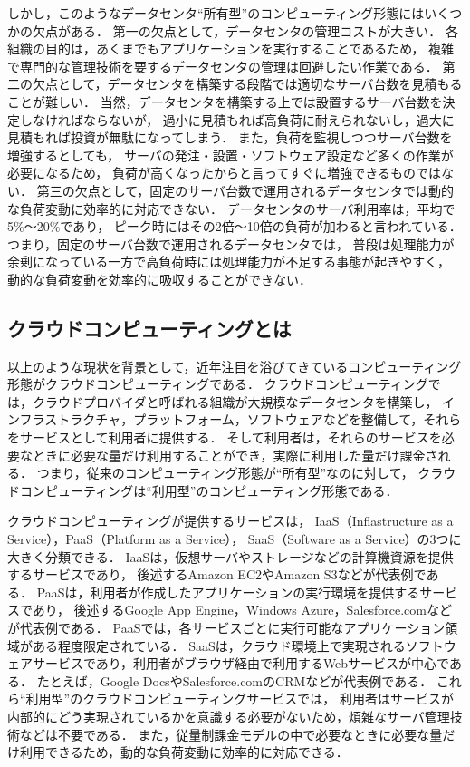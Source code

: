 \documentclass[10pt]{jsarticle}
\begin{document}
しかし，このようなデータセンタ``所有型''のコンピューティング形態にはいくつかの欠点がある．
第一の欠点として，データセンタの管理コストが大きい．
各組織の目的は，あくまでもアプリケーションを実行することであるため，
複雑で専門的な管理技術を要するデータセンタの管理は回避したい作業である．
第二の欠点として，データセンタを構築する段階では適切なサーバ台数を見積もることが難しい．
当然，データセンタを構築する上では設置するサーバ台数を決定しなければならないが，
過小に見積もれば高負荷に耐えられないし，過大に見積もれば投資が無駄になってしまう．
また，負荷を監視しつつサーバ台数を増強するとしても，
サーバの発注・設置・ソフトウェア設定など多くの作業が必要になるため，
負荷が高くなったからと言ってすぐに増強できるものではない．
第三の欠点として，固定のサーバ台数で運用されるデータセンタでは動的な負荷変動に効率的に対応できない．
データセンタのサーバ利用率は，平均で5\%〜20\%であり，
ピーク時にはその2倍〜10倍の負荷が加わると言われている\cite{t10}．
つまり，固定のサーバ台数で運用されるデータセンタでは，
普段は処理能力が余剰になっている一方で高負荷時には処理能力が不足する事態が起きやすく，
動的な負荷変動を効率的に吸収することができない．

\subsection{クラウドコンピューティングとは}

以上のような現状を背景として，近年注目を浴びてきているコンピューティング形態がクラウドコンピューティング\cite{t10,t11,t12}である．
クラウドコンピューティングでは，クラウドプロバイダと呼ばれる組織が大規模なデータセンタを構築し，
インフラストラクチャ，プラットフォーム，ソフトウェアなどを整備して，それらをサービスとして利用者に提供する．
そして利用者は，それらのサービスを必要なときに必要な量だけ利用することができ，実際に利用した量だけ課金される．
つまり，従来のコンピューティング形態が``所有型''なのに対して，
クラウドコンピューティングは``利用型''のコンピューティング形態である．

クラウドコンピューティングが提供するサービスは，
IaaS（Inflastructure as a Service），PaaS（Platform as a Service），
SaaS（Software as a Service）の3つに大きく分類できる．
IaaSは，仮想サーバやストレージなどの計算機資源を提供するサービスであり，
後述するAmazon EC2やAmazon S3\cite{t20}などが代表例である．
PaaSは，利用者が作成したアプリケーションの実行環境を提供するサービスであり，
後述するGoogle App Engine\cite{t21}，Windows Azure\cite{t22}，Salesforce.com\cite{t23}などが代表例である．
PaaSでは，各サービスごとに実行可能なアプリケーション領域がある程度限定されている．
SaaSは，クラウド環境上で実現されるソフトウェアサービスであり，利用者がブラウザ経由で利用するWebサービスが中心である．
たとえば，Google Docs\cite{t24}やSalesforce.comのCRMなどが代表例である．
これら``利用型''のクラウドコンピューティングサービスでは，
利用者はサービスが内部的にどう実現されているかを意識する必要がないため，煩雑なサーバ管理技術などは不要である．
また，従量制課金モデルの中で必要なときに必要な量だけ利用できるため，動的な負荷変動に効率的に対応できる．
\end{document}
